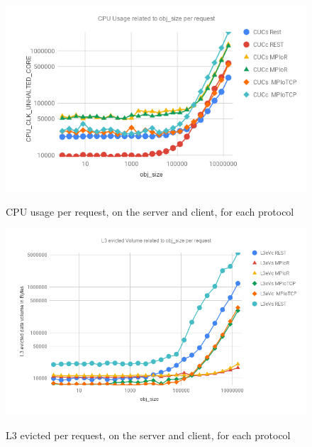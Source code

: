 \documentclass[runningheads]{llncs}
\begin{document}
\begin{figure}
    \centering
    \begin{minipage}{0.49\textwidth}
        \centering
        \includegraphics[width=1\textwidth]{cpu-usage-rest-mpi.png}\vspace{-1em}
        \caption{CPU usage per request, on the server and client, for each protocol}\vspace{-1.5em}
		\label{fig:cpu-usage-rest-mpi}
    \end{minipage}\hfill
    \begin{minipage}{0.49\textwidth}
        \centering
        \includegraphics[width=1\textwidth]{l3ev-rest-mpi.png}\vspace{-1em}
        \caption{L3 evicted per request, on the server and client, for each protocol}\vspace{-1.5em}
		\label{fig:l3ev-rest-mpi}
    \end{minipage}
\end{figure}
\end{document}
